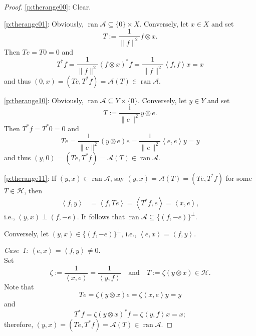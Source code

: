 \documentclass[10pt,a4paper]{amsart}
\providecommand{\mA}{\mathcal{A}}
\providecommand{\mH}{\mathcal{H}}
\newcommand{\ran}{\ensuremath{\operatorname{ran}}}
\newcommand{\scal}[2]{\left\langle{#1},{#2}  \right\rangle}
\begin{document}
\begin{proof}
\cref{p:therange00}: Clear. 

\cref{p:therange01}: 
Obviously, $\ran\mA\subseteq \{0\}\times X$.
Conversely, let $x\in X$ and set
\begin{equation}
T := \frac{1}{\|f\|^2}f\otimes x.
\end{equation}
Then $Te=T0 = 0$ and 
\begin{equation}
T^*f = \frac{1}{\|f\|^2}(f\otimes x)^*f
= \frac{1}{\|f\|^2}\scal{f}{f}x = x
\end{equation}
and thus 
$(0,x)=(Te,T^*f)=\mA(T)\in\ran\mA$.

\cref{p:therange10}: 
Obviously, $\ran\mA\subseteq Y\times \{0\}$.
Conversely, let $y\in Y$ and set
\begin{equation}
T := \frac{1}{\|e\|^2}y\otimes e.
\end{equation}
Then $T^*f=T^*0 = 0$ and 
\begin{equation}
Te = \frac{1}{\|e\|^2}(y\otimes e)e
= \frac{1}{\|e\|^2}\scal{e}{e}y = y
\end{equation}
and thus 
$(y,0)=(Te,T^*f)=\mA(T)\in\ran\mA$.

\cref{p:therange11}: 
If $(y,x)\in\ran\mA$, say
$(y,x)=\mathcal{A}(T)=(Te,T^*f)$ for some $T\in\mH$, 
then
\begin{align}
\scal{f}{y}
&=\scal{f}{Te}
= \scal{T^*f}{e}
=\scal{x}{e},
\end{align}
i.e., $(y,x)\perp (f,-e)$.
It follows that $\ran\mA\subseteq \{(f,-e)\}^\perp$.

Conversely, let $(y,x)\in\{(f,-e)\}^\perp$, i.e., 
$\scal{e}{x}=\scal{f}{y}$.

{\it Case~1:} $\scal{e}{x}=\scal{f}{y}\neq 0$.\\
Set
\begin{equation}
\zeta := \frac{1}{\scal{x}{e}}=\frac{1}{\scal{y}{f}} 
\quad\text{and}\quad
T := \zeta (y\otimes x)\in\mH.
\end{equation}
Note that 
\begin{equation}
Te = \zeta(y\otimes x)e
= \zeta \scal{x}{e}y = y
\end{equation}
and 
\begin{equation}
T^*f = \zeta (y\otimes  x)^*f
= \zeta\scal{y}{f}x = x;
\end{equation}
therefore, $(y,x)=(Te,T^*f)=\mA(T)\in\ran \mA$.


\end{proof}
\end{document}
